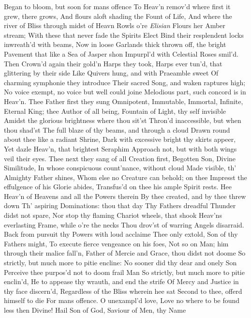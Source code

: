 \documentclass[11pt]{book}
\newcounter {first}
\newcounter {last}
\begin{document}
Began to bloom, but soon for mans offence 
To Heav'n remov'd where first it grew, there grows, 
And flours aloft shading the Fount of Life, 
And where the river of Bliss through midst of Heavn 
Rowls o're \textit{Elisian} Flours her Amber stream; 
With these that never fade the Spirits Elect 
Bind their resplendent locks inwreath'd with beams, 
Now in loose Garlands thick thrown off, the bright 
Pavement that like a Sea of Jasper shon 
Impurpl'd with Celestial Roses smil'd. 
Then Crown'd again their gold'n Harps they took, 
Harps ever tun'd, that glittering by their side 
Like Quivers hung, and with Praeamble sweet 
Of charming symphonie they introduce 
Their sacred Song, and waken raptures high; 
No voice exempt, no voice but well could joine 
Melodious part, such concord is in Heav'n. 
\quad Thee Father first they sung Omnipotent, 
Immutable, Immortal, Infinite, 
Eternal King; thee Author of all being, 
Fountain of Light, thy self invisible 
Amidst the glorious brightness where thou sit'st 
Thron'd inaccessible, but when thou shad'st 
The full blaze of thy beams, and through a cloud 
Drawn round about thee like a radiant Shrine, 
Dark with excessive bright thy skirts appeer, 
Yet dazle Heav'n, that brightest Seraphim 
Approach not, but with both wings veil their eyes. 
Thee next they sang of all Creation first, 
Begotten Son, Divine Similitude, 
In whose conspicuous count'nance, without cloud 
Made visible, th' Almighty Father shines, 
Whom else no Creature can behold; on thee 
Impresst the effulgence of his Glorie abides, 
Transfus'd on thee his ample Spirit rests. 
Hee Heav'n of Heavens and all the Powers therein 
By thee created, and by thee threw down 
Th' aspiring Dominations: thou that day 
Thy Fathers dreadful Thunder didst not spare, 
Nor stop thy flaming Chariot wheels, that shook 
Heav'ns everlasting Frame, while o're the necks 
Thou drov'st of warring Angels disarraid. 
Back from pursuit thy Powers with loud acclaime 
Thee only extold, Son of thy Fathers might, 
To execute fierce vengeance on his foes, 
Not so on Man; him through their malice fall'n, 
Father of Mercie and Grace, thou didst not doome 
So strictly, but much more to pitie encline: 
No sooner did thy dear and onely Son 
Perceive thee purpos'd not to doom frail Man 
So strictly, but much more to pitie enclin'd, 
He to appease thy wrauth, and end the strife 
Of Mercy and Justice in thy face discern'd, 
Regardless of the Bliss wherein hee sat 
Second to thee, offerd himself to die 
For mans offence.  O unexampl'd love, 
Love no where to be found less then Divine! 
Hail Son of God, Saviour of Men, thy Name 
\end{document}
